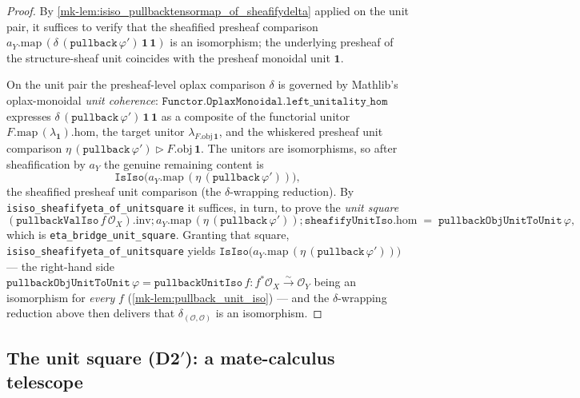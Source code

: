 \begin{proof}
  \leanok
  By \ref{mk-lem:isiso_pullbacktensormap_of_sheafifydelta} applied on the unit pair,
  it suffices to verify that the sheafified presheaf comparison
  \(a_Y.\mathrm{map}\,(\delta\,(\mathtt{pullback}\,\varphi')\,\mathbf{1}\,\mathbf{1})\)
  is an isomorphism; the underlying presheaf of the structure-sheaf unit coincides with
  the presheaf monoidal unit \(\mathbf{1}\).

  On the unit pair the presheaf-level oplax comparison \(\delta\) is governed by Mathlib's
  oplax-monoidal \emph{unit coherence}: \(\mathtt{Functor.OplaxMonoidal.left\_unitality\_hom}\)
  expresses \(\delta\,(\mathtt{pullback}\,\varphi')\,\mathbf{1}\,\mathbf{1}\) as a composite of
  the functorial unitor \(F.\mathrm{map}\,(\lambda_{\mathbf{1}}).\mathrm{hom}\), the target
  unitor \(\lambda_{F.\mathrm{obj}\,\mathbf{1}}\), and the whiskered presheaf unit comparison
  \(\eta\,(\mathtt{pullback}\,\varphi') \rhd F.\mathrm{obj}\,\mathbf{1}\). The unitors are
  isomorphisms, so after sheafification by \(a_Y\) the genuine remaining content is
  \[
    \mathtt{IsIso}\bigl(a_Y.\mathrm{map}\,(\eta\,(\mathtt{pullback}\,\varphi'))\bigr),
  \]
  the sheafified presheaf unit comparison (the \(\delta\)-wrapping reduction). By \texttt{isiso\_sheafifyeta\_of\_unitsquare} it suffices, in turn, to prove the
  \emph{unit square}
  \[
    (\mathtt{pullbackValIso}\,f\,\mathcal{O}_X).\mathrm{inv} \mathbin{;}
      a_Y.\mathrm{map}\,(\eta\,(\mathtt{pullback}\,\varphi')) \mathbin{;}
      \mathtt{sheafifyUnitIso}.\mathrm{hom}
      \;=\; \mathtt{pullbackObjUnitToUnit}\,\varphi,
  \]
  which is \texttt{eta\_bridge\_unit\_square}. Granting that square,
  \texttt{isiso\_sheafifyeta\_of\_unitsquare} yields
  \(\mathtt{IsIso}\bigl(a_Y.\mathrm{map}\,(\eta\,(\mathtt{pullback}\,\varphi'))\bigr)\) --- the
  right-hand side \(\mathtt{pullbackObjUnitToUnit}\,\varphi = \mathtt{pullbackUnitIso}\,f :
  f^*\mathcal{O}_X \xrightarrow{\sim} \mathcal{O}_Y\) being an isomorphism for \emph{every}
  \(f\) (\ref{mk-lem:pullback_unit_iso}) --- and the \(\delta\)-wrapping reduction above then
  delivers that \(\delta_{(\mathcal{O},\mathcal{O})}\) is an isomorphism.
\end{proof}

\subsection{The unit square (D2$'$): a mate-calculus telescope}

